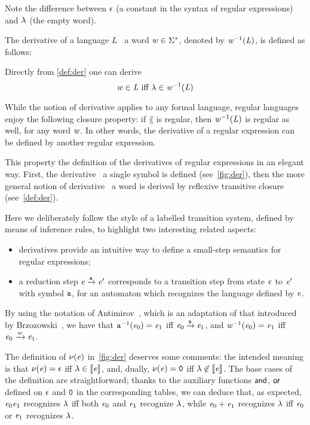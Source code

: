 Note the difference between $\mathtt {\epsilon}$ (a constant in the syntax of regular expressions) and $\lambda$ (the empty word).

The derivative of a language $L$ \wrt~a word $\mathit {w}\in\Sigma^*$, denoted by $\mathit {w}^{-1}(\mathit {L})$, is defined as follows:
Directly from \cref{def:der} one can derive
\begin{equation}
 \label{eq:der}
 \mathit {w}\in\mathit {L} \mbox{ iff }
 \lambda\in\mathit {w}^{-1}(\mathit {L})
\end{equation}

While the notion of derivative applies to any formal language, regular languages enjoy the following closure property: if $\lang$ is regular, then
$\mathit {w}^{-1}(\mathit {L})$ is regular as well, for any word $\mathit {w}$. In other words, the derivative of a regular expression can be defined by another regular expression.

This property the definition of the derivatives of regular expressions in an elegant way.
First, the derivative \wrt~a single symbol is defined (see~\cref{fig:der}), then
the more general notion of derivative \wrt~a word is derived by reflexive  transitive closure (see~\cref{def:der}).

Here we deliberately follow the style of a labelled transition system, defined by means of inference rules, to highlight two interesting related aspects:
\begin{itemize}
 \item derivatives provide an intuitive way to define a small-step semantics for regular expressions;
 \item a reduction step $\mathit {e}\xrightarrow{\mathtt {a}}\mathit {e}'$ corresponds to a transition step from state $\mathit {e}$ to $\mathit {e}'$ with symbol $\mathtt {a}$, for an automaton which recognizes the language defined by $\mathit {e}$.
\end{itemize}
By using the notation of Antimirov~\cite{Antimirov96}, which is an adaptation of that introduced by Brzozowski~\cite{Brzozowski64}, we have
that $\mathtt {a}^{-1}(\mathit {e}_0)=\mathit {e}_1$ iff $\mathit {e}_0\xrightarrow{\mathtt {a}}\mathit {e}_1$, and $\mathit {w}^{-1}(\mathit {e}_0)=\mathit {e}_1$ iff $\mathit {e}_0\xrightarrow{\mathit {w}}\mathit {e}_1$.

The definition of $\nu({\mathit {e}})$ in~\cref{fig:der} deserves some comments:
the intended meaning is that $\nu({\mathit {e}})=\mathtt {\epsilon}$ iff
$\lambda\in\left\llbracket{\ensuremath{\mathit {e}}}\right\rrbracket$, and, dually, $\nu({\mathit {e}})=\mathtt {0}$ iff
$\lambda\not\in\left\llbracket{\ensuremath{\mathit {e}}}\right\rrbracket$. The base cases of the definition are straightforward; thanks to the auxiliary functions $\mathbin{\mathsf{and}}$, $\mathbin{\mathsf{or}}$ defined on $\mathtt {\epsilon}$ and $\mathtt {0}$ in the corresponding tables, we can deduce that, as expected, $\mathit {e}_0\mathit {e}_1$ recognizes $\lambda$ iff both $\mathit {e}_0$ and $\mathit {e}_1$ recognize $\lambda$, while  $\mathit {e}_0\mathbin{+}\mathit {e}_1$ recognizes $\lambda$ iff $\mathit {e}_0$ or $\mathit {e}_1$ recognizes $\lambda$.

